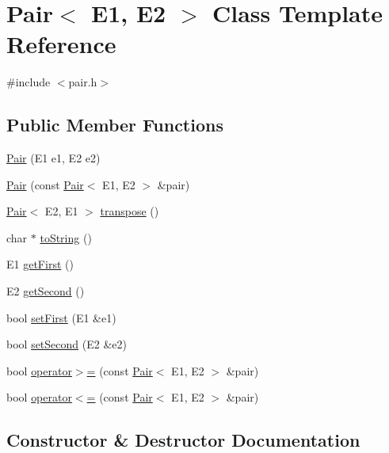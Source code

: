 \hypertarget{classPair}{}\section{Pair$<$ E1, E2 $>$ Class Template Reference}
\label{classPair}


{\ttfamily \#include $<$pair.\+h$>$}

\subsection*{Public Member Functions}
\begin{DoxyCompactItemize}
\item 
\hyperlink{classPair_af80c627fda7a8c366cb7eb0b9373b818}{Pair} (E1 e1, E2 e2)
\item 
\hyperlink{classPair_af8ffd06c98b76caa0ef3cfbbb610d8f3}{Pair} (const \hyperlink{classPair}{Pair}$<$ E1, E2 $>$ \&pair)
\item 
\hyperlink{classPair}{Pair}$<$ E2, E1 $>$ \hyperlink{classPair_a0b0091b32ea0f9d3fdcaeec5899e90c6}{transpose} ()
\item 
char $\ast$ \hyperlink{classPair_a0e0d8500d25e2d3e583866151737f96c}{to\+String} ()
\item 
E1 \hyperlink{classPair_a5d9bb4e73cbf094f3554b82a6f58f913}{get\+First} ()
\item 
E2 \hyperlink{classPair_a8df972c70a2f8fd3ee564c9d322bf30b}{get\+Second} ()
\item 
bool \hyperlink{classPair_ae913d817d854f97b7f023ebc57269ef1}{set\+First} (E1 \&e1)
\item 
bool \hyperlink{classPair_aa05202b8aeb2d36872c4d20d01726850}{set\+Second} (E2 \&e2)
\item 
bool \hyperlink{classPair_acf05dd1d9abb560c4a7db0b27117296e}{operator$>$=} (const \hyperlink{classPair}{Pair}$<$ E1, E2 $>$ \&pair)
\item 
bool \hyperlink{classPair_a8f20084cc163e96cbfbae0281ffc7f9f}{operator$<$=} (const \hyperlink{classPair}{Pair}$<$ E1, E2 $>$ \&pair)
\end{DoxyCompactItemize}


\subsection{Constructor \& Destructor Documentation}
\mbox{\label{classPair_af80c627fda7a8c366cb7eb0b9373b818}} 
